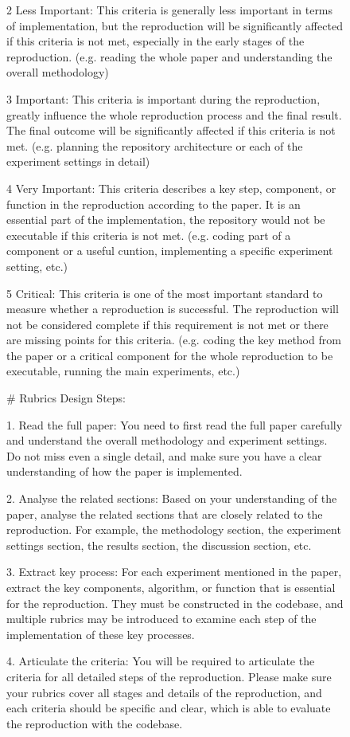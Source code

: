 \documentclass[11pt]{article}
\begin{document}
\begin{figure}[h]
\begin{tcolorbox}[]
2 Less Important: This criteria is generally less important in terms of implementation, but the reproduction will be significantly affected if this criteria is not met, especially in the early stages of the reproduction. (e.g. reading the whole paper and understanding the overall methodology)

3 Important: This criteria is important during the reproduction, greatly influence the whole reproduction process and the final result. The final outcome will be significantly affected if this criteria is not met. (e.g. planning the repository architecture or each of the experiment settings in detail)

4 Very Important: This criteria describes a key step, component, or function in the reproduction according to the paper. It is an essential part of the implementation, the repository would not be executable if this criteria is not met. (e.g. coding part of a component or a useful cuntion, implementing a specific experiment setting, etc.)

5 Critical: This criteria is one of the most important standard to measure whether a reproduction is successful. The reproduction will not be considered complete if this requirement is not met or there are missing points for this criteria. (e.g. coding the key method from the paper or a critical component for the whole reproduction to be executable, running the main experiments, etc.)

\# Rubrics Design Steps:

1. Read the full paper: You need to first read the full paper carefully and understand the overall methodology and experiment settings. Do not miss even a single detail, and make sure you have a clear understanding of how the paper is implemented.

2. Analyse the related sections: Based on your understanding of the paper, analyse the related sections that are closely related to the reproduction. For example, the methodology section, the experiment settings section, the results section, the discussion section, etc.

3. Extract key process: For each experiment mentioned in the paper, extract the key components, algorithm, or function that is essential for the reproduction. They must be constructed in the codebase, and multiple rubrics may be introduced to examine each step of the implementation of these key processes.

4. Articulate the criteria: You will be required to articulate the criteria for all detailed steps of the reproduction. Please make sure your rubrics cover all stages and details of the reproduction, and each criteria should be specific and clear, which is able to evaluate the reproduction with the codebase.


\end{tcolorbox}
\end{figure}
\end{document}
